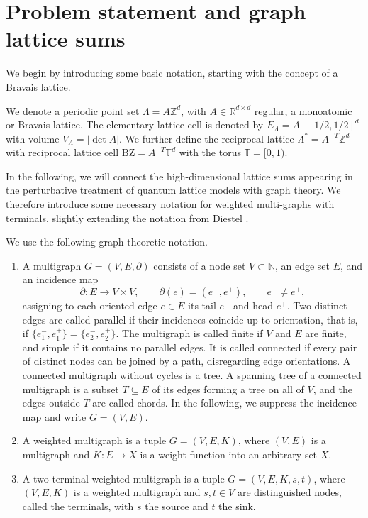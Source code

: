 \documentclass[]{amsart}
\numberwithin{mythm}{section}
\begin{document}
\section{Problem statement and graph lattice sums}
\label{sec:main_result}
We begin by introducing some basic notation, starting with the concept of a Bravais lattice.
\begin{definition}[Lattices]
    We denote a periodic point set $\Lambda=A\mathds Z^d$, with $A\in \mathds R^{d\times d}$ regular, a monoatomic or Bravais lattice. The elementary lattice cell is denoted by $E_\Lambda=A[-1/2,1/2]^d$ with volume $V_\Lambda=|\det A|$. We further define the reciprocal lattice $\Lambda^\ast=A^{-T}\mathds Z^d$ with reciprocal lattice cell $\mathrm{BZ}=A^{-T}\mathds T^d$ with the torus $\mathds T=[0,1)$.
\end{definition}

In the following, we will connect the high-dimensional lattice sums appearing in the perturbative treatment of quantum lattice models with graph theory. We therefore introduce some necessary notation for weighted multi-graphs with terminals, slightly extending the notation from Diestel \cite{diestel2025graph}.

\begin{definition}[Graphs]
We use the following graph-theoretic notation.
\begin{enumerate}
\item A multigraph $G=(V,E,\partial)$ consists of a node set $V\subset\mathds N$, an edge set $E$, and an incidence map
\[
\partial:E\to V\times V,\qquad \partial(e)=(e^-,e^+),\qquad
e^-\neq e^+,
\]
assigning to each oriented edge $e\in E$ its tail $e^-$ and head $e^+$. Two distinct edges are called parallel if their incidences coincide up to orientation, that is, if $\{e_1^-,e_1^+\}=\{e_2^-,e_2^+\}$. The multigraph is called finite if $V$ and $E$ are finite, and simple if it contains no parallel edges. It is called connected if every pair of distinct nodes can be joined by a path, disregarding edge orientations. A connected multigraph without cycles is a tree. A spanning tree of a connected multigraph is a subset $T\subseteq E$ of its edges forming a tree on all of $V$, and the edges outside $T$ are called chords. In the following, we suppress the incidence map and write $G=(V,E)$.
\item A weighted multigraph is a tuple $G=(V,E,K)$, where $(V,E)$ is a multigraph and $K:E\to X$ is a weight function into an arbitrary set $X$.
\item A two-terminal weighted multigraph is a tuple $G=(V,E,K,s,t)$, where $(V,E,K)$ is a weighted multigraph and $s,t\in V$ are distinguished nodes, called the terminals, with $s$ the source and $t$ the sink.
\end{enumerate}
\end{definition}
\end{document}
